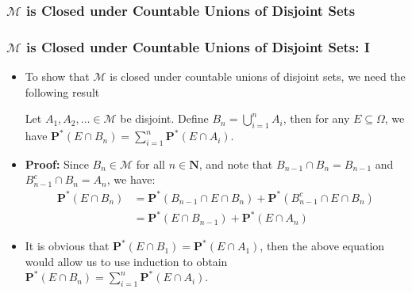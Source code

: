 \documentclass[handout]{beamer}
\newcommand{\BP}{\mathbf{P}}
\begin{document}
\subsubsection{$\mathcal{M}$ is Closed under Countable Unions of Disjoint Sets}
\frame
{
  \frametitle{$\mathcal{M}$ is Closed under Countable Unions of Disjoint Sets: I}

   \begin{itemize}

            \item<1->  To show that $\mathcal{M}$ is closed under countable unions of disjoint sets, we need the following result
\begin{Lemma}[2.3.11] Let $A_1, A_2,\ldots \in \mathcal{M}$ be disjoint. Define $B_n=\bigcup_{i=1}^n A_i$, then for any $E\subseteq \Omega$, we have 
             $\BP^*(E\cap B_n)=\sum_{i=1}^n \BP^* (E\cap A_i)$. \end{Lemma}    
       
              \item<2-> []\textbf{Proof:} Since $B_n\in \mathcal{M}$ for all $n\in \mathbf{N}$, and note that $B_{n-1}\cap B_n=B_{n-1}$ and $B_{n-1}^c\cap B_n=A_{n}$, we have:
             \begin{align*} \BP^*( E\cap B_n)& = \BP^*( B_{n-1}\cap E\cap B_n)+ \BP^*( B_{n-1}^c \cap E\cap B_n) \\ 
             &= \BP^*( E\cap B_{n-1})+ \BP^*(  E\cap A_n)             \end{align*}
                 
              \item<3-> [] It is obvious that $\BP^*( E\cap B_1)=\BP^*( E\cap A_1)$, then the above equation would allow us to use induction to obtain $\BP^*(E\cap B_n)=\sum_{i=1}^n \BP^* (E\cap A_i)$.
             
             
                 \end{itemize}
}
\end{document}
